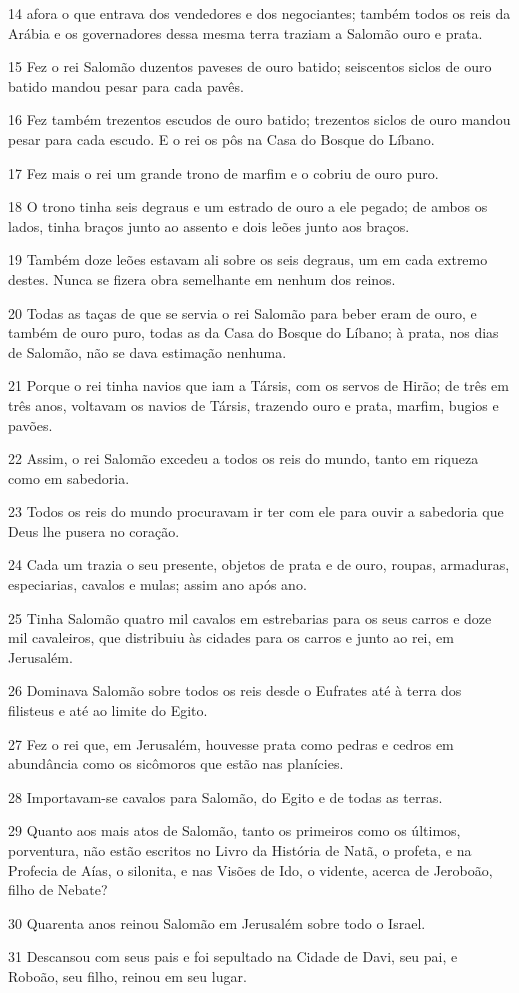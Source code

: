 \par 14 afora o que entrava dos vendedores e dos negociantes; também todos os reis da Arábia e os governadores dessa mesma terra traziam a Salomão ouro e prata.
\par 15 Fez o rei Salomão duzentos paveses de ouro batido; seiscentos siclos de ouro batido mandou pesar para cada pavês.
\par 16 Fez também trezentos escudos de ouro batido; trezentos siclos de ouro mandou pesar para cada escudo. E o rei os pôs na Casa do Bosque do Líbano.
\par 17 Fez mais o rei um grande trono de marfim e o cobriu de ouro puro.
\par 18 O trono tinha seis degraus e um estrado de ouro a ele pegado; de ambos os lados, tinha braços junto ao assento e dois leões junto aos braços.
\par 19 Também doze leões estavam ali sobre os seis degraus, um em cada extremo destes. Nunca se fizera obra semelhante em nenhum dos reinos.
\par 20 Todas as taças de que se servia o rei Salomão para beber eram de ouro, e também de ouro puro, todas as da Casa do Bosque do Líbano; à prata, nos dias de Salomão, não se dava estimação nenhuma.
\par 21 Porque o rei tinha navios que iam a Társis, com os servos de Hirão; de três em três anos, voltavam os navios de Társis, trazendo ouro e prata, marfim, bugios e pavões.
\par 22 Assim, o rei Salomão excedeu a todos os reis do mundo, tanto em riqueza como em sabedoria.
\par 23 Todos os reis do mundo procuravam ir ter com ele para ouvir a sabedoria que Deus lhe pusera no coração.
\par 24 Cada um trazia o seu presente, objetos de prata e de ouro, roupas, armaduras, especiarias, cavalos e mulas; assim ano após ano.
\par 25 Tinha Salomão quatro mil cavalos em estrebarias para os seus carros e doze mil cavaleiros, que distribuiu às cidades para os carros e junto ao rei, em Jerusalém.
\par 26 Dominava Salomão sobre todos os reis desde o Eufrates até à terra dos filisteus e até ao limite do Egito.
\par 27 Fez o rei que, em Jerusalém, houvesse prata como pedras e cedros em abundância como os sicômoros que estão nas planícies.
\par 28 Importavam-se cavalos para Salomão, do Egito e de todas as terras.
\par 29 Quanto aos mais atos de Salomão, tanto os primeiros como os últimos, porventura, não estão escritos no Livro da História de Natã, o profeta, e na Profecia de Aías, o silonita, e nas Visões de Ido, o vidente, acerca de Jeroboão, filho de Nebate?
\par 30 Quarenta anos reinou Salomão em Jerusalém sobre todo o Israel.
\par 31 Descansou com seus pais e foi sepultado na Cidade de Davi, seu pai, e Roboão, seu filho, reinou em seu lugar.

